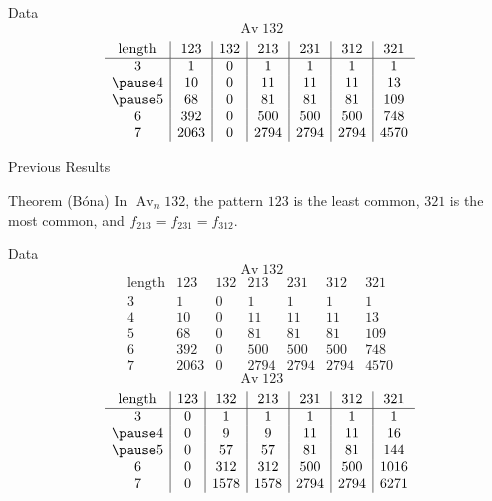 \documentclass[xcolor=dvipsnames]{beamer}
\DeclareMathOperator{\Av}{Av}
\newcommand{\num}{f}
\begin{document}
\begin{frame}{Data}
  \pause
  \vspace{-1pc}
  $$ \Av 132 $$
  $$\begin{array}{c|c|c|c|c|c|c}
      \text{length} & 123 & 132 & 213 & 231
      & 312 & 321 \\
      \hline
     3  & 1     &    0  &    1 &    1 &    1 &    1  \\
     \pause
     4  & 10    &    0  &   11 &   11 &   11 &   13  \\
     \pause
     5  & 68    &    0  &   81 &   81 &   81 &  109  \\
     6  & 392   &    0  &  500 &  500 &  500 &  748  \\ 
     7  & 2063  &    0  & 2794 & 2794 & 2794 & 4570   
   \end{array}
  $$
\end{frame}

\begin{frame}{Previous Results}

  \begin{block}{Theorem (B\'ona)}
    In $\Av_n 132$, the pattern $123$ is the least common, $321$ is the most
    common, and $\num_{213} = \num_{231} = \num_{312}$. \\
  \end{block}
    
\end{frame}


\begin{frame}{Data}
  \pause
  \vspace{-1pc}
  $$ \Av 132 $$
  $$\begin{array}{c|c|c|c|c|c|c}
      \text{length} & 123 & 132 & 213 & 231
      & 312 & 321 \\
      \hline
     3  & 1     &    0  &    1 &    1 &    1 &    1  \\
     4  & 10    &    0  &   11 &   11 &   11 &   13  \\
     5  & 68    &    0  &   81 &   81 &   81 &  109  \\
     6  & 392   &    0  &  500 &  500 &  500 &  748  \\ 
     7  & 2063  &    0  & 2794 & 2794 & 2794 & 4570   
   \end{array}
  $$
  \pause
  $$\Av 123 $$
  $$\begin{array}{c|c|c|c|c|c|c}
      \text{length} & 123 & 132 & 213 & 231
      & 312 & 321 \\
      \hline
      3  & 0     &    1  &    1 &    1 &    1 &    1  \\
      \pause
      4  & 0     &    9  &    9 &   11 &   11 &   16  \\
      \pause
      5  & 0     &    57 &   57 &   81 &   81 &  144  \\
      6  & 0     &   312 &  312 &  500 &  500 & 1016  \\ 
      7  & 0     &  1578 & 1578 & 2794 & 2794 & 6271   
    \end{array}
  $$
\end{frame}
\end{document}
